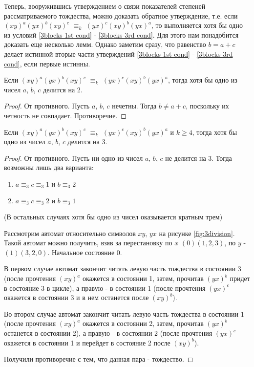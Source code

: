 	Теперь, вооружившись утверждением о связи показателей степеней рассматриваемого тождества, можно доказать обратное утверждение, т.е. если $(xy)^a(yx)^b(xy)^c$ $\equiv_k$ $(yx)^c(xy)^b(yx)^a$, то выполняется хотя бы одно из условий \ref{3blocks 1st cond} - \ref{3blocks 3rd cond}. Для этого нам понадобится доказать еще несколько лемм.
	Однако заметим сразу, что равенство $b = a + c$ делает истинной вторые части утверждений \ref{3blocks 1st cond} - \ref{3blocks 3rd cond}, если первые истинны.
	
	\begin{lemma}\label{abc div 2}
		 Если $(xy)^a(yx)^b(xy)^c$ $\equiv_k$ $(yx)^c(xy)^b(yx)^a$, тогда хотя бы одно из чисел $a$, $b$, $c$ делится на 2.
	\end{lemma}
	\begin{proof}
		От противного. Пусть $a$, $b$, $c$ нечетны. Тогда $b \ne a+c$, поскольку их четность не совпадает. Противоречие.
	\end{proof}

	\begin{lemma}\label{abc div 3}
		Если $(xy)^a(yx)^b(xy)^c$ $\equiv_k$ $(yx)^c(xy)^b(yx)^a$ и $k \ge 4$, тогда хотя бы одно из чисел $a$, $b$, $c$ делится на 3.
	\end{lemma}
	\begin{proof}
		От противного. Пусть ни одно из чисел $a$, $b$, $c$ не делится на 3. Тогда возможны лишь два варианта:
		\begin{enumerate}
			\item $a \equiv_3 c \equiv_3 1$ и $b \equiv_3 2$
			\item $a \equiv_3 c \equiv_3 2$ и $b \equiv_3 1$
		\end{enumerate}
	
		(В остальных случаях хотя бы одно из чисел оказывается кратным трем)
		
		Рассмотрим автомат относительно символов $xy$, $yx$ на рисунке \ref{fig:3division}. Такой автомат можно получить, взяв за перестановку по $x$ $(0)(1,2,3)$, по $y$ - $(1)(3, 2, 0)$. Начальное состояние 0.
		
		В первом случае автомат закончит читать левую часть тождества в состоянии 3 (после прочтения $(xy)^a$ окажется в состоянии 1, затем, прочитав $(yx)^b$ придет в состояние 3 в цикле), а правую - в состоянии 1 (после прочтения $(yx)^c$ окажется в состоянии 3 и в нем останется после $(xy)^b$).
		
		
		Во втором случае автомат закончит читать левую часть тождества в состоянии 1 (после прочтения $(xy)^a$ окажется в состоянии 2, затем, прочитав $(yx)^b$ останется в состоянии 2), а правую - в состоянии 2 (после прочтения $(yx)^c$ окажется в состоянии 1 и перейдет в состояние 2 после $(xy)^b$).
		
		Получили противоречие с тем, что данная пара - тождество.
	\end{proof}

